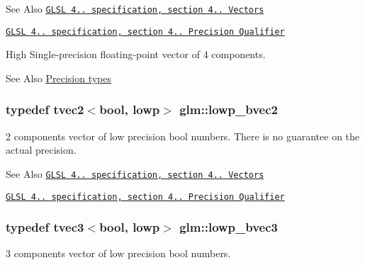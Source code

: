 \begin{DoxySeeAlso}{See Also}
\href{http://www.opengl.org/registry/doc/GLSLangSpec.4.20.8.pdf}{\tt G\-L\-S\-L 4.. specification, section 4.. Vectors} 

\href{http://www.opengl.org/registry/doc/GLSLangSpec.4.20.8.pdf}{\tt G\-L\-S\-L 4.. specification, section 4.. Precision Qualifier}
\end{DoxySeeAlso}
High Single-\/precision floating-\/point vector of 4 components. \begin{DoxySeeAlso}{See Also}
\hyperlink{group__core__precision}{Precision types} 
\end{DoxySeeAlso}
\hypertarget{group__core__precision_gaf17553233b30d9ed413e822847c4ea8f}{
\subsubsection[{lowp\-\_\-bvec2}]{\setlength{\rightskip}{0pt plus 5cm}typedef tvec2$<$bool, lowp$>$ {\bf glm\-::lowp\-\_\-bvec2}}}\label{group__core__precision_gaf17553233b30d9ed413e822847c4ea8f}
2 components vector of low precision bool numbers. There is no guarantee on the actual precision.

\begin{DoxySeeAlso}{See Also}
\href{http://www.opengl.org/registry/doc/GLSLangSpec.4.20.8.pdf}{\tt G\-L\-S\-L 4.. specification, section 4.. Vectors} 

\href{http://www.opengl.org/registry/doc/GLSLangSpec.4.20.8.pdf}{\tt G\-L\-S\-L 4.. specification, section 4.. Precision Qualifier} 
\end{DoxySeeAlso}
\hypertarget{group__core__precision_ga9ebdb78c611619993b9d5b182010529d}{
\subsubsection[{lowp\-\_\-bvec3}]{\setlength{\rightskip}{0pt plus 5cm}typedef tvec3$<$bool, lowp$>$ {\bf glm\-::lowp\-\_\-bvec3}}}\label{group__core__precision_ga9ebdb78c611619993b9d5b182010529d}
3 components vector of low precision bool numbers.

